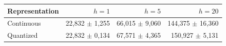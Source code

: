 \begin{tabular}{@{}lrrr@{}}
\toprule
Representation & $h=1$ & $h=5$ & $h=20$ \\
\midrule
Continuous & 22,832 $\pm$ 1,255 & 66,015 $\pm$ 9,060 & 144,375 $\pm$ 16,360 \\
Quantized & 22,832 $\pm$ 0,134 & 67,571 $\pm$ 4,365 & 150,927 $\pm$ 5,131 \\
\bottomrule
\end{tabular}
